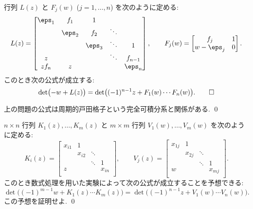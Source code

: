 \documentclass[12pt,twoside]{jarticle}
\begin{document}
\begin{question}[50点]
  \label{q:det-(2,n)-model}
  行列 $L(z)$ と $F_j(w)$ ($j=1,\ldots,n$) を次のように定める:
  \begin{equation*}
    L(z) = 
    \begin{bmatrix}
      \eps_1 & f_1    & 1      & & \\
             & \eps_2 & f_2    & \ddots & \\
             &        & \eps_3 & \ddots & 1 \\
      z      &        &        & \ddots & f_{n-1} \\
      z f_n  & z      &        &        & \eps_n \\
    \end{bmatrix},
    \qquad
    F_j(w)=
    \begin{bmatrix}
      f_j        & 1 \\
      w - \eps_j & 0 \\
    \end{bmatrix}.
  \end{equation*}
  このとき次の公式が成立する:
  \begin{equation*}
    \det\bigl( -w + L(z) \bigr)
    =
    \det\bigl( (-1)^{n-1}z + F_1(w)\cdots F_n(w) \bigr).
  \qed
  \end{equation*}
\end{question}

\begin{guide}
  上の問題の公式は周期的戸田格子という完全可積分系と関係がある. \qed
\end{guide}

\begin{question}[200点]
  \label{q:det-(m,n)-model}
  $n\times n$ 行列 $K_1(z),\ldots,K_m(z)$ 
  と $m\times m$ 行列 $V_1(w),\ldots,V_m(w)$ を次のように定める:
  \begin{equation*}
    K_i(z) = 
    \begin{bmatrix}
      x_{i1} & 1      & & \\
             & x_{i2} & \ddots & \\
             &        & \ddots & 1 \\
      z      &        &        & x_{in} \\
    \end{bmatrix},
    \qquad
    V_j(z) = 
    \begin{bmatrix}
      x_{1j} & 1      & & \\
             & x_{2j} & \ddots & \\
             &        & \ddots & 1 \\
      w      &        &        & x_{mj} \\
    \end{bmatrix}.
  \end{equation*}
  このとき数式処理を用いた実験によって次の公式が成立することを予想できる:
  \begin{equation*}
    \det\bigl( (-1)^{m-1}w + K_1(z)\cdots K_m(z) \bigr)
    =
    \det\bigl( (-1)^{n-1}z + V_1(w)\cdots V_n(w) \bigr).
  \end{equation*}
  この予想を証明せよ. \qed
\end{question}
\end{document}
